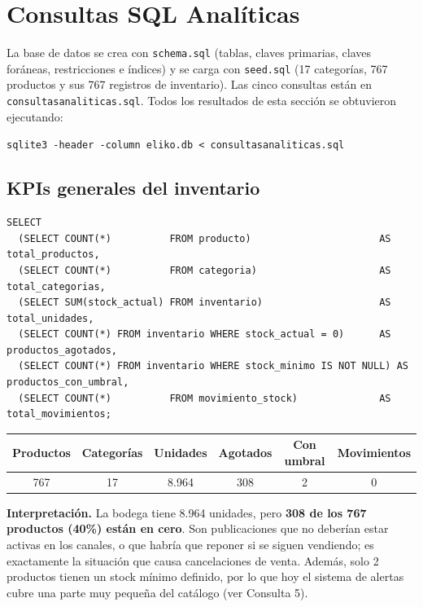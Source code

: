 \documentclass[11pt,letterpaper]{article}
\renewcommand{\_}{\oldus\allowbreak}
\begin{document}
\section{Consultas SQL Analíticas}
La base de datos se crea con \texttt{schema.sql} (tablas, claves primarias, claves foráneas, restricciones e índices) y se carga con \texttt{seed.sql} (17 categorías, 767 productos y sus 767 registros de inventario). Las cinco consultas están en \texttt{consultas\_analiticas.sql}. Todos los resultados de esta sección se obtuvieron ejecutando:
\begin{center}
\texttt{sqlite3 -header -column eliko.db < consultas\_analiticas.sql}
\end{center}

\subsection{KPIs generales del inventario}
\begin{lstlisting}[caption={Consulta 1: KPIs generales.}]
SELECT
  (SELECT COUNT(*)          FROM producto)                      AS total_productos,
  (SELECT COUNT(*)          FROM categoria)                     AS total_categorias,
  (SELECT SUM(stock_actual) FROM inventario)                    AS total_unidades,
  (SELECT COUNT(*) FROM inventario WHERE stock_actual = 0)      AS productos_agotados,
  (SELECT COUNT(*) FROM inventario WHERE stock_minimo IS NOT NULL) AS productos_con_umbral,
  (SELECT COUNT(*)          FROM movimiento_stock)              AS total_movimientos;
\end{lstlisting}

\begin{center}
\small
\begin{minipage}{\textwidth}\centering
{}
\begin{tabular}{cccccc}
\toprule
\textbf{Productos} & \textbf{Categorías} & \textbf{Unidades} & \textbf{Agotados} & \textbf{Con umbral} & \textbf{Movimientos} \\
\midrule
767 & 17 & 8.964 & 308 & 2 & 0 \\
\bottomrule
\end{tabular}
\end{minipage}
\end{center}

\textbf{Interpretación.} La bodega tiene 8.964 unidades, pero \textbf{308 de los 767 productos (40\%) están en cero}. Son publicaciones que no deberían estar activas en los canales, o que habría que reponer si se siguen vendiendo; es exactamente la situación que causa cancelaciones de venta. Además, solo 2 productos tienen un stock mínimo definido, por lo que hoy el sistema de alertas cubre una parte muy pequeña del catálogo (ver Consulta 5).
\end{document}
